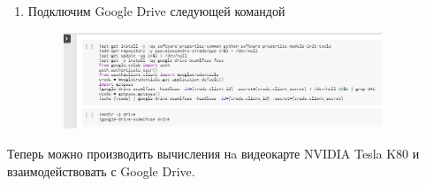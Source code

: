 \begin{enumerate}
\item Подключим Google Drive следующей командой
\begin{figure}[h]
    \centering
    \includegraphics[width=0.9\textwidth]{colab_settings_4.png}
    \label{fig:colab_settings_4}
\end{figure}

\end{enumerate}

Теперь можно производить вычисления нa видеокарте NVIDIA Tesla K80 и взаимодействовать с Google Drive.

\newpage 